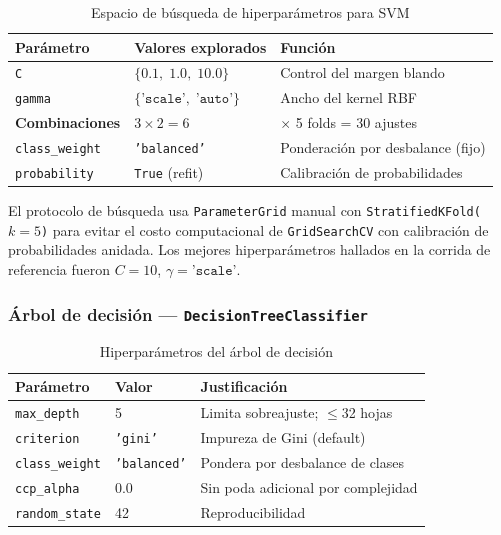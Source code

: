 \documentclass[12pt,a4paper]{article}
\begin{document}
\begin{table}[H]
  \centering
  \caption{Espacio de búsqueda de hiperparámetros para SVM}
  \begin{tabular}{lll}
    \toprule
    \textbf{Parámetro} & \textbf{Valores explorados} & \textbf{Función}\\
    \midrule
    \texttt{C} & $\{0.1,\; 1.0,\; 10.0\}$ & Control del margen blando\\
    \texttt{gamma} & $\{\texttt{'scale'},\; \texttt{'auto'}\}$ & Ancho del kernel RBF\\
    \textbf{Combinaciones} & $3 \times 2 = 6$ & $\times$ 5 folds = 30 ajustes\\
    \texttt{class\_weight} & \texttt{'balanced'} & Ponderación por desbalance (fijo)\\
    \texttt{probability} & \texttt{True} (refit) & Calibración de probabilidades\\
    \bottomrule
  \end{tabular}
\end{table}

El protocolo de búsqueda usa \texttt{ParameterGrid} manual con \texttt{StratifiedKFold($k=5$)} para evitar el costo computacional de \texttt{GridSearchCV} con calibración de probabilidades anidada. Los mejores hiperparámetros hallados en la corrida de referencia fueron $C=10$, $\gamma=\texttt{'scale'}$.

\subsubsection{Árbol de decisión — \texttt{DecisionTreeClassifier}}

\begin{table}[H]
  \centering
  \caption{Hiperparámetros del árbol de decisión}
  \begin{tabular}{lll}
    \toprule
    \textbf{Parámetro} & \textbf{Valor} & \textbf{Justificación}\\
    \midrule
    \texttt{max\_depth} & 5 & Limita sobreajuste; $\leq$32 hojas\\
    \texttt{criterion} & \texttt{'gini'} & Impureza de Gini (default)\\
    \texttt{class\_weight} & \texttt{'balanced'} & Pondera por desbalance de clases\\
    \texttt{ccp\_alpha} & 0.0 & Sin poda adicional por complejidad\\
    \texttt{random\_state} & 42 & Reproducibilidad\\
    \bottomrule
  \end{tabular}
\end{table}
\end{document}
